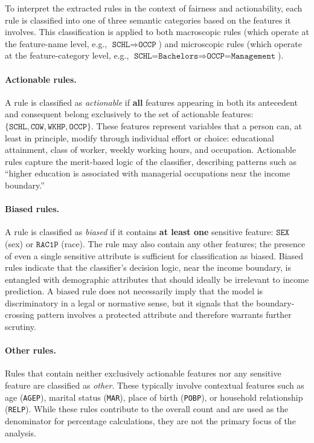 To interpret the extracted rules in the context of fairness and actionability, each rule is classified into one of three semantic categories based on the features it involves. This classification is applied to both macroscopic rules (which operate at the feature-name level, e.g., $\texttt{SCHL} \Rightarrow \texttt{OCCP}$) and microscopic rules (which operate at the feature-category level, e.g., $\texttt{SCHL=Bachelors} \Rightarrow \texttt{OCCP=Management}$).

\paragraph{Actionable rules.} A rule is classified as \emph{actionable} if \textbf{all} features appearing in both its antecedent and consequent belong exclusively to the set of actionable features: $\{\texttt{SCHL}, \texttt{COW}, \texttt{WKHP}, \texttt{OCCP}\}$. These features represent variables that a person can, at least in principle, modify through individual effort or choice: educational attainment, class of worker, weekly working hours, and occupation. Actionable rules capture the merit-based logic of the classifier, describing patterns such as ``higher education is associated with managerial occupations near the income boundary.''

\paragraph{Biased rules.} A rule is classified as \emph{biased} if it contains \textbf{at least one} sensitive feature: $\texttt{SEX}$ (sex) or $\texttt{RAC1P}$ (race). The rule may also contain any other features; the presence of even a single sensitive attribute is sufficient for classification as biased. Biased rules indicate that the classifier's decision logic, near the income boundary, is entangled with demographic attributes that should ideally be irrelevant to income prediction. A biased rule does not necessarily imply that the model is discriminatory in a legal or normative sense, but it signals that the boundary-crossing pattern involves a protected attribute and therefore warrants further scrutiny.

\paragraph{Other rules.} Rules that contain neither exclusively actionable features nor any sensitive feature are classified as \emph{other}. These typically involve contextual features such as age (\texttt{AGEP}), marital status (\texttt{MAR}), place of birth (\texttt{POBP}), or household relationship (\texttt{RELP}). While these rules contribute to the overall count and are used as the denominator for percentage calculations, they are not the primary focus of the analysis.

